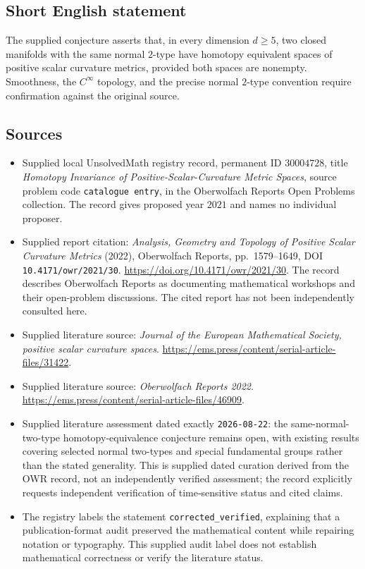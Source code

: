 \documentclass[11pt]{article}
\begin{document}
\subsection{Short English statement}
The supplied conjecture asserts that, in every dimension \(d\geq5\), two closed manifolds with the same normal \(2\)-type have homotopy equivalent spaces of positive scalar curvature metrics, provided both spaces are nonempty. Smoothness, the \(C^\infty\) topology, and the precise normal \(2\)-type convention require confirmation against the original source.
\subsection{Sources}
\begin{itemize}
\item Supplied local UnsolvedMath registry record, permanent ID \(30004728\), title \emph{Homotopy Invariance of Positive-Scalar-Curvature Metric Spaces}, source problem code \texttt{catalogue entry}, in the Oberwolfach Reports Open Problems collection. The record gives proposed year \(2021\) and names no individual proposer.
\item Supplied report citation: \emph{Analysis, Geometry and Topology of Positive Scalar Curvature Metrics} (2022), Oberwolfach Reports, pp.\ 1579--1649, DOI \texttt{10.4171/owr/2021/30}. \url{https://doi.org/10.4171/owr/2021/30}. The record describes Oberwolfach Reports as documenting mathematical workshops and their open-problem discussions. The cited report has not been independently consulted here.
\item Supplied literature source: \emph{Journal of the European Mathematical Society, positive scalar curvature spaces}. \url{https://ems.press/content/serial-article-files/31422}.
\item Supplied literature source: \emph{Oberwolfach Reports 2022}. \url{https://ems.press/content/serial-article-files/46909}.
\item Supplied literature assessment dated exactly \texttt{2026-08-22}: the same-normal-two-type homotopy-equivalence conjecture remains open, with existing results covering selected normal two-types and special fundamental groups rather than the stated generality. This is supplied dated curation derived from the OWR record, not an independently verified assessment; the record explicitly requests independent verification of time-sensitive status and cited claims.
\item The registry labels the statement \texttt{corrected\_verified}, explaining that a publication-format audit preserved the mathematical content while repairing notation or typography. This supplied audit label does not establish mathematical correctness or verify the literature status.
\end{itemize}
\end{document}
